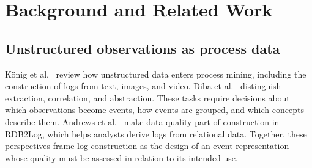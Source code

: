 \section{Background and Related Work}
\label{sec:relatedWork}
\subsection{Unstructured observations as process data}
K\"onig et al.~\cite{konig2025unstructured} review how unstructured data enters process mining, including the construction of logs from text, images, and video. Diba et al.~\cite{diba2020extraction} distinguish extraction, correlation, and abstraction. These tasks require decisions about which observations become events, how events are grouped, and which concepts describe them. Andrews et al.~\cite{andrews2020quality} make data quality part of construction in RDB2Log, which helps analysts derive logs from relational data. Together, these perspectives frame log construction as the design of an event representation whose quality must be assessed in relation to its intended use.

